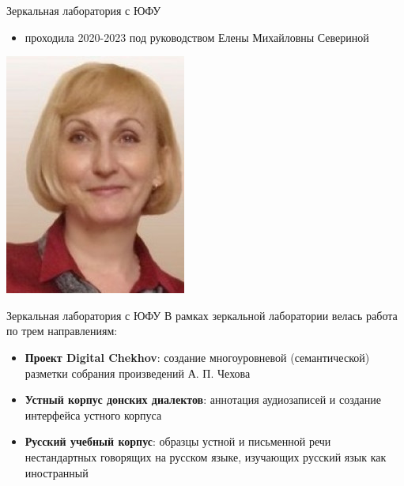 \documentclass[
  ignorenonframetext,
]{beamer}
\providecommand{\tightlist}{%
  \setlength{\itemsep}{0pt}\setlength{\parskip}{0pt}}
\begin{document}
\begin{frame}{Зеркальная лаборатория с ЮФУ}
\protect\hypertarget{ux437ux435ux440ux43aux430ux43bux44cux43dux430ux44f-ux43bux430ux431ux43eux440ux430ux442ux43eux440ux438ux44f-ux441-ux44eux444ux443}{}
\begin{itemize}
\tightlist
\item
  проходила 2020-2023 под руководством Елены Михайловны Севериной
\end{itemize}

\begin{center}\includegraphics[width=0.3\linewidth]{images/severina} \end{center}
\end{frame}

\begin{frame}{Зеркальная лаборатория с ЮФУ}
\protect\hypertarget{ux437ux435ux440ux43aux430ux43bux44cux43dux430ux44f-ux43bux430ux431ux43eux440ux430ux442ux43eux440ux438ux44f-ux441-ux44eux444ux443-1}{}
В рамках зеркальной лаборатории велась работа по трем направлениям:

\begin{itemize}
\tightlist
\item
  \textbf{Проект Digital Chekhov}: создание многоуровневой
  (семантической) разметки собрания произведений А. П. Чехова
\item
  \textbf{Устный корпус донских диалектов}: аннотация аудиозаписей и
  создание интерфейса устного корпуса
\item
  \textbf{Русский учебный корпус}: образцы устной и письменной речи
  нестандартных говорящих на русском языке, изучающих русский язык как
  иностранный
\end{itemize}
\end{frame}
\end{document}
